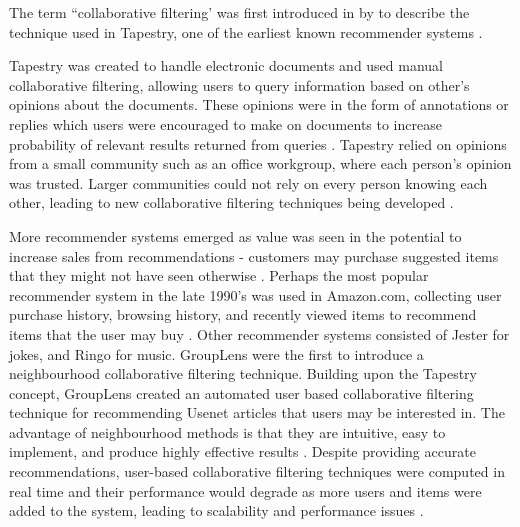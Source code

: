 The term ``collaborative filtering' was first introduced in \citeyear{goldberg1992using} by \citeauthor{goldberg1992using} to describe the technique used in Tapestry, one of the earliest known recommender systems \cite{koren2009matrix,  goldberg1992using, itembased, survey}.

Tapestry \cite{goldberg1992using} was created to handle electronic documents and used manual collaborative filtering, allowing users to query information based on other's opinions about the documents. These opinions were in the form of annotations or replies which users were encouraged to make on documents to increase probability of relevant results returned from queries \cite{schafer2007collaborative}. Tapestry relied on opinions from a small community such as an office workgroup, where each person's opinion was trusted. Larger communities could not rely on every person knowing each other, leading to new collaborative filtering techniques being developed \cite{itembased}. 

More recommender systems emerged as value was seen in the potential to increase sales from recommendations - customers may purchase suggested items that they might not have seen otherwise \cite{schafer2007collaborative}. Perhaps the most popular recommender system in the late 1990's was used in Amazon.com, collecting user purchase history, browsing history, and recently viewed items to recommend items that the user may buy \cite{schafer2007collaborative}. Other recommender systems consisted of Jester \cite{goldberg} for jokes, and Ringo \cite{ringo} for music.
GroupLens \cite{grouplens} were the first to introduce a neighbourhood collaborative filtering technique. Building upon the Tapestry concept, GroupLens created an automated user based collaborative filtering technique for recommending Usenet articles that users may be interested in. The advantage of neighbourhood methods is that they are intuitive, easy to implement, and produce highly effective results \cite{survey, scalable}. Despite providing accurate recommendations, user-based collaborative filtering techniques were computed in real time and their performance would degrade as more users and items were added to the system, leading to scalability and performance issues \cite{dimension, itembased, evaluationitem}.

